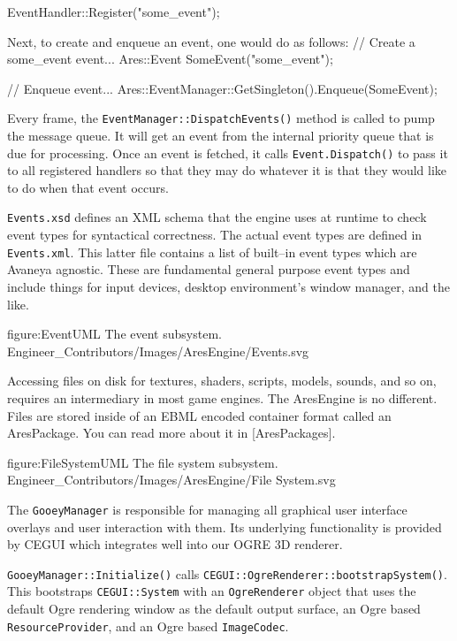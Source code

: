 \startCodeExample
EventHandler::Register("some_event");
\stopCodeExample

Next, to create and enqueue an event, one would do as follows:
\startCodeExample
// Create a some_event event...
Ares::Event SomeEvent("some_event");

// Enqueue event...
Ares::EventManager::GetSingleton().Enqueue(SomeEvent);
\stopCodeExample

Every frame, the {\tt EventManager::DispatchEvents()} method is called to pump the message queue. It will get an event from the internal priority queue that is due for processing. Once an event is fetched, it calls {\tt Event.Dispatch()} to pass it to all registered handlers so that they may do whatever it is that they would like to do when that event occurs.

{\tt Events.xsd} defines an XML schema that the engine uses at runtime to check event types for syntactical correctness. The actual event types are defined in {\tt Events.xml}. This latter file contains a list of built--in event types which are Avaneya agnostic. These are fundamental general purpose event types and include things for input devices, desktop environment's window manager, and the like.

\FullPageDiagram
    {figure:EventUML}
    {The event subsystem.}
    {Engineer_Contributors/Images/AresEngine/Events.svg}

\page 
{}
Accessing files on disk for textures, shaders, scripts, models, sounds, and so on, requires an intermediary in most game engines. The AresEngine is no different. Files are stored inside of an EBML encoded container format called an AresPackage. You can read more about it in [AresPackages]. 

\FullPageDiagram
    {figure:FileSystemUML}
    {The file system subsystem.}
    {Engineer_Contributors/Images/AresEngine/File System.svg}

\page 
{}
The {\tt GooeyManager} is responsible for managing all graphical user interface overlays and user interaction with them. Its underlying functionality is provided by CEGUI which integrates well into our OGRE 3D renderer.

{\tt GooeyManager::Initialize()} calls {\tt CEGUI::OgreRenderer::bootstrapSystem()}. This bootstraps {\tt CEGUI::System} with an {\tt OgreRenderer} object that uses the default Ogre rendering window as the default output surface, an Ogre based {\tt ResourceProvider}, and an Ogre based {\tt ImageCodec}.

